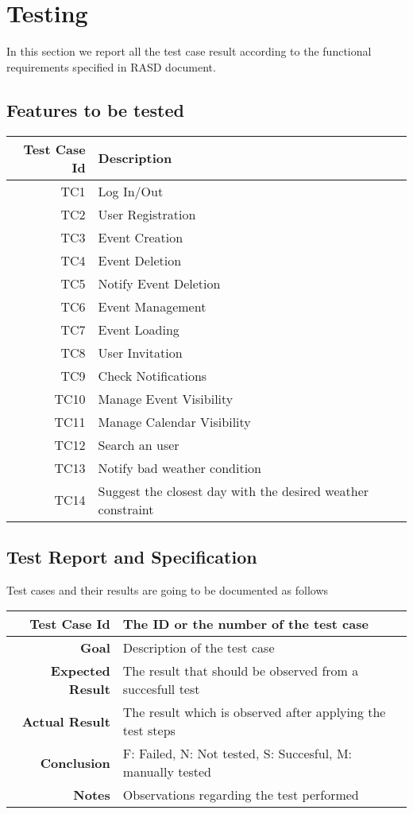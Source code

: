 \chapter{Testing} \label{cap:cap2}
In this section we report all the test case result according to the functional requirements specified in RASD document.

 \section{Features to be tested}
 \begin{tabularx}{\linewidth}{|r|X|X|}
  \hline  {\bf Test Case Id} &{\bf Description}\\
  \hline TC1 & Log In/Out \\
  \hline TC2 & User Registration \\
  \hline TC3 & Event Creation \\
  \hline TC4 & Event Deletion \\
  \hline TC5 & Notify Event Deletion \\
  \hline TC6 & Event Management \\
  \hline TC7 & Event Loading\\
  \hline TC8 & User Invitation \\
  \hline TC9 & Check Notifications \\
  \hline TC10 & Manage Event Visibility \\
  \hline TC11 & Manage Calendar Visibility \\
  \hline TC12 & Search an user \\
  \hline TC13 & Notify bad weather condition \\ 
  \hline TC14 & Suggest the closest day with the desired weather constraint \\
  \hline
\end{tabularx}
 
\section{Test Report and Specification}
Test cases and their results are going to be documented as follows\\
\begin{tabularx}{\linewidth}{|r|X|X|}
  \hline   {\bf Test Case Id} &  The ID or the number of the test case\\
  \hline  {\bf Goal} & Description of the test case\\
  \hline  {\bf Expected Result} & The result that should be observed from a succesfull test\\
  \hline  {\bf Actual Result} & The result which is observed after applying the test steps\\
  \hline  {\bf Conclusion} & F: Failed, N: Not tested, S: Succesful, M: manually tested\\
  \hline  {\bf Notes} & Observations regarding the test performed\\
  \hline
\end{tabularx}


